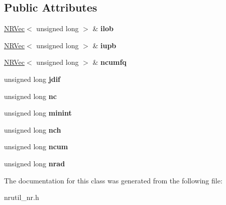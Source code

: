 \subsection*{Public Attributes}
\begin{DoxyCompactItemize}
\item 
\hyperlink{class_n_r_vec}{N\+R\+Vec}$<$ unsigned long $>$ \& {\bfseries ilob}\hypertarget{classarithcode_ac9a044ea0598b6f648ad4870f33d9d18}{}\label{classarithcode_ac9a044ea0598b6f648ad4870f33d9d18}

\item 
\hyperlink{class_n_r_vec}{N\+R\+Vec}$<$ unsigned long $>$ \& {\bfseries iupb}\hypertarget{classarithcode_af7c423f14a05b50f4f8dd656fa3660cc}{}\label{classarithcode_af7c423f14a05b50f4f8dd656fa3660cc}

\item 
\hyperlink{class_n_r_vec}{N\+R\+Vec}$<$ unsigned long $>$ \& {\bfseries ncumfq}\hypertarget{classarithcode_ae1966ac0bde27c0ada1bc025632054e6}{}\label{classarithcode_ae1966ac0bde27c0ada1bc025632054e6}

\item 
unsigned long {\bfseries jdif}\hypertarget{classarithcode_a271bde4d35b6613bdcae4060007221fd}{}\label{classarithcode_a271bde4d35b6613bdcae4060007221fd}

\item 
unsigned long {\bfseries nc}\hypertarget{classarithcode_a7c5f805d81735fb362c8bb317753737c}{}\label{classarithcode_a7c5f805d81735fb362c8bb317753737c}

\item 
unsigned long {\bfseries minint}\hypertarget{classarithcode_a34e73f5416ac3d861722215a987c3554}{}\label{classarithcode_a34e73f5416ac3d861722215a987c3554}

\item 
unsigned long {\bfseries nch}\hypertarget{classarithcode_ad687412f244bd2ed9daf154934a1594c}{}\label{classarithcode_ad687412f244bd2ed9daf154934a1594c}

\item 
unsigned long {\bfseries ncum}\hypertarget{classarithcode_af5af3b7b8db9b90a1038d97c30c5bdf9}{}\label{classarithcode_af5af3b7b8db9b90a1038d97c30c5bdf9}

\item 
unsigned long {\bfseries nrad}\hypertarget{classarithcode_a01f26d81945f369b49a532a419c9e4e2}{}\label{classarithcode_a01f26d81945f369b49a532a419c9e4e2}

\end{DoxyCompactItemize}


The documentation for this class was generated from the following file\+:\begin{DoxyCompactItemize}
\item 
nrutil\+\_\+nr.\+h\end{DoxyCompactItemize}
